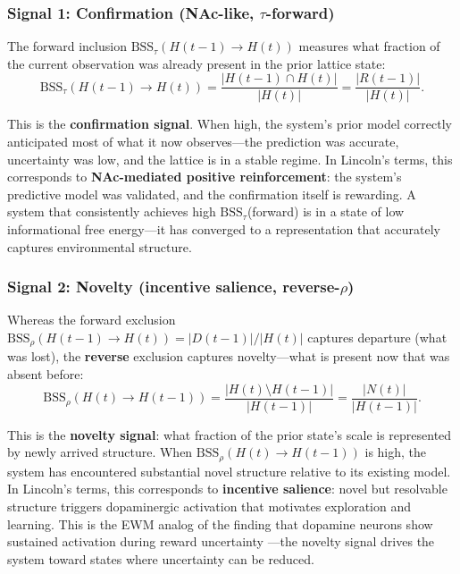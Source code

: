 \documentclass[11pt,a4paper]{article}
\theoremstyle{remark}
\begin{document}
\subsubsection*{Signal 1: Confirmation (NAc-like, $\tau$-forward)}

The forward inclusion $\text{BSS}_{\tau}(H(t-1) \to H(t))$ measures what
fraction of the current observation was already present in the prior lattice
state:
\begin{equation}
  \text{BSS}_{\tau}(H(t-1) \to H(t)) = \frac{|H(t-1) \cap H(t)|}{|H(t)|}
  = \frac{|R(t-1)|}{|H(t)|}.
\end{equation}

This is the \textbf{confirmation signal}. When high, the system's prior model
correctly anticipated most of what it now observes---the prediction was
accurate, uncertainty was low, and the lattice is in a stable regime. In
Lincoln's terms, this corresponds to \textbf{NAc-mediated positive
reinforcement}: the system's predictive model was validated, and the
confirmation itself is rewarding. A system that consistently achieves high
$\text{BSS}_{\tau}$(forward) is in a state of low informational free energy---it
has converged to a representation that accurately captures environmental
structure.

\subsubsection*{Signal 2: Novelty (incentive salience, reverse-$\rho$)}

Whereas the forward exclusion $\text{BSS}_{\rho}(H(t-1) \to H(t)) =
|D(t-1)|/|H(t)|$ captures departure (what was lost), the \textbf{reverse}
exclusion captures novelty---what is present now that was absent before:
\begin{equation}
  \text{BSS}_{\rho}(H(t) \to H(t-1)) = \frac{|H(t) \setminus H(t-1)|}{|H(t-1)|}
  = \frac{|N(t)|}{|H(t-1)|}.
\end{equation}

This is the \textbf{novelty signal}: what fraction of the prior state's scale
is represented by newly arrived structure. When $\text{BSS}_{\rho}(H(t) \to
H(t-1))$ is high, the system has encountered substantial novel structure
relative to its existing model. In Lincoln's terms, this corresponds to
\textbf{incentive salience}: novel but resolvable structure triggers
dopaminergic activation that motivates exploration and learning. This is the
EWM analog of the finding that dopamine neurons show sustained activation during
reward uncertainty \cite{lincoln2026}---the novelty signal drives the system
toward states where uncertainty can be reduced.
\end{document}
